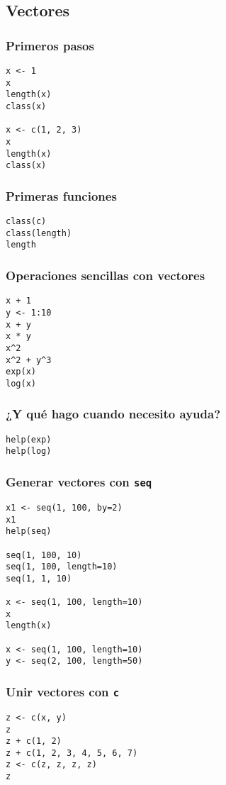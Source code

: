 \documentclass[xcolor={usenames,svgnames,dvipsnames}]{beamer}
\begin{document}
\subsection{Vectores}
\label{sec-2-1}
\begin{frame}[fragile]
\frametitle{Primeros pasos}
\label{sec-2-1-1}


\lstset{language=R}
\begin{lstlisting}
x <- 1
x
length(x)
class(x)

x <- c(1, 2, 3)
x
length(x)
class(x)
\end{lstlisting}
\end{frame}
\begin{frame}[fragile]
\frametitle{Primeras funciones}
\label{sec-2-1-2}


\lstset{language=R}
\begin{lstlisting}
class(c)
class(length)
length
\end{lstlisting}
\end{frame}
\begin{frame}[fragile]
\frametitle{Operaciones sencillas con vectores}
\label{sec-2-1-3}


\lstset{language=R}
\begin{lstlisting}
x + 1
y <- 1:10
x + y
x * y
x^2
x^2 + y^3
exp(x)
log(x)
\end{lstlisting}
\end{frame}
\begin{frame}[fragile]
\frametitle{¿Y qué hago cuando necesito ayuda?}
\label{sec-2-1-4}



\lstset{language=R}
\begin{lstlisting}
help(exp)
help(log)
\end{lstlisting}
\end{frame}
\begin{frame}[fragile]
\frametitle{Generar vectores con \texttt{seq}}
\label{sec-2-1-5}


\lstset{language=R}
\begin{lstlisting}
x1 <- seq(1, 100, by=2)
x1
help(seq)

seq(1, 100, 10)
seq(1, 100, length=10)
seq(1, 1, 10)

x <- seq(1, 100, length=10)
x
length(x)

x <- seq(1, 100, length=10)
y <- seq(2, 100, length=50)
\end{lstlisting}
\end{frame}
\begin{frame}[fragile]
\frametitle{Unir vectores con \texttt{c}}
\label{sec-2-1-6}


\lstset{language=R}
\begin{lstlisting}
z <- c(x, y)
z
z + c(1, 2)
z + c(1, 2, 3, 4, 5, 6, 7)
z <- c(z, z, z, z)
z
\end{lstlisting}
\end{frame}
\end{document}
